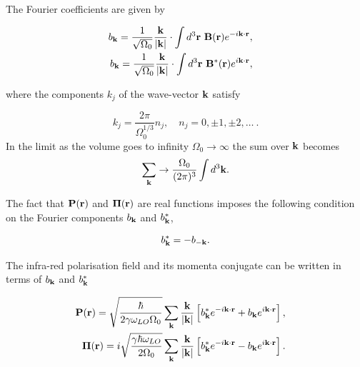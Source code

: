 The Fourier coefficients are given by

\begin{subequations}
\begin{align}
    \begin{split}
        b_{\vb{k}} &= \frac{1}{\sqrt{\Omega_0}} \frac{\vb{k}}{\abs{\vb{k}}} \cdot \int d^3\vb{r}\  \vb{B}(\vb{r}) e^{-i \vb{k} \cdot \vb{r}},
    \end{split}\\
    \begin{split}
        b_{\vb{k}} &= \frac{1}{\sqrt{\Omega_0}} \frac{\vb{k}}{\abs{\vb{k}}} \cdot \int d^3\vb{r}\  \vb{B}^*(\vb{r}) e^{i \vb{k} \cdot \vb{r}},
    \end{split}
\end{align}
\end{subequations}

where the components $k_j$ of the wave-vector $\vb{k}$ satisfy

\begin{equation}
    k_j = \frac{2\pi}{\Omega_0^{1/3}} n_j, \quad n_j = 0, \pm 1, \pm 2, \dots \ .
\end{equation}
In the limit as the volume goes to infinity $\Omega_0 \to \infty$ the sum over $\vb{k}$ becomes
\begin{equation}
    \sum_{\vb{k}} \rightarrow \frac{\Omega_0}{(2\pi)^3} \int d^3 \vb{k}.
\end{equation}

The fact that $\vb{P}(\vb{r})$ and $\vb{\Pi}(\vb{r})$ are real functions imposes the following condition on the Fourier components $b_{\vb{k}}$ and $b^*_{\vb{k}}$,

\begin{equation}
    b^*_{\vb{k}} = -b_{-\vb{k}}.
\end{equation}

The infra-red polarisation field and its momenta conjugate can be written in terms of $b_{\vb{k}}$ and $b^*_{\vb{k}}$ 

\begin{subequations}
\begin{align}
    \begin{split}
        \vb{P}(\vb{r}) &= \sqrt{\frac{\hbar}{2\gamma\omega_{LO}\Omega_0}} \sum_{\vb{k}} \frac{\vb{k}}{\abs{\vb{k}}} \left[b^*_{\vb{k}}e^{-i\vb{k}\cdot\vb{r}} + b_{\vb{k}} e^{i\vb{k}\cdot\vb{r}}\right],
    \end{split}\\
    \begin{split}
        \vb{\Pi}(\vb{r}) &= i\sqrt{\frac{\gamma\hbar\omega_{LO}}{2\Omega_0}} \sum_{\vb{k}} \frac{\vb{k}}{\abs{\vb{k}}} \left[b^*_{\vb{k}}e^{-i\vb{k}\cdot\vb{r}} - b_{\vb{k}} e^{i\vb{k}\cdot\vb{r}}\right].
    \end{split}
\end{align}
\end{subequations}

